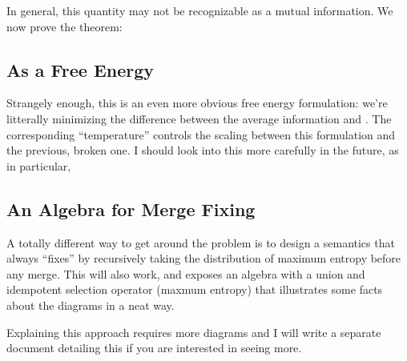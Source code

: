 \documentclass{article}
\begin{document}
	In general, this quantity may not be recognizable as a mutual information. We now prove the theorem:
	

	
	\subsection{As a Free Energy}
	Strangely enough, this is an even more obvious free energy formulation: we're litterally minimizing the difference between the average information and . The corresponding ``temperature'' controls the scaling between this formulation and the previous, broken one. I should look into this more carefully in the future, as in particular, 
	
	\subsection{An Algebra for Merge Fixing}
	A totally different way to get around the problem is to design a semantics that always ``fixes'' by recursively taking the distribution of maximum entropy before any merge. This will also work, and exposes an algebra with a union and idempotent selection operator (maxmum entropy) that illustrates some facts about the diagrams in a neat way. 
	
	Explaining this approach requires more diagrams and I will write a separate document detailing this if you are interested in seeing more.
	
\end{document}
